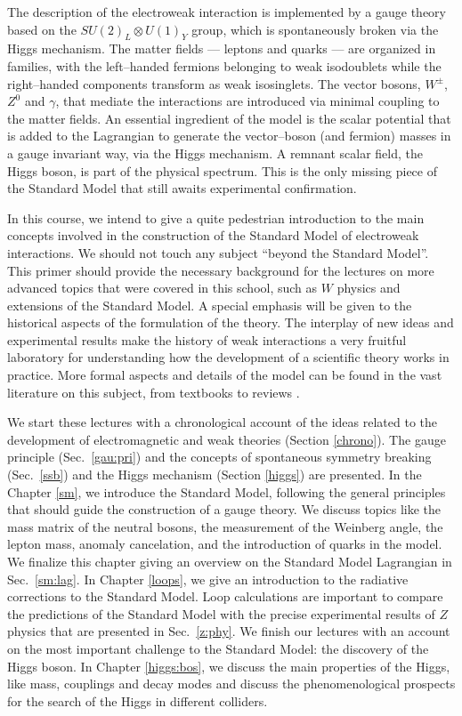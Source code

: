 \documentclass[12pt]{report}
\begin{document}
The description of the electroweak interaction is implemented by a
gauge theory based on the $SU(2)_L \otimes U(1)_Y$ group, which is
spontaneously broken via the Higgs mechanism. The matter fields ---
leptons and quarks --- are organized in families, with the
left--handed fermions belonging to weak isodoublets while the
right--handed components transform as weak isosinglets. The vector
bosons, $W^\pm$, $Z^0$ and $\gamma$, that mediate the interactions
are introduced via minimal coupling to the matter fields. An
essential ingredient of the model is the scalar potential that is
added to the Lagrangian to generate the vector--boson (and fermion)
masses in a gauge invariant way, via the Higgs mechanism. A remnant
scalar field, the Higgs boson, is part of the physical spectrum. This
is the only missing piece of the Standard Model that still awaits
experimental confirmation.  

In this course, we intend to give a quite pedestrian introduction to
the main concepts involved in the construction of the Standard Model
of electroweak interactions. We should not touch any subject ``beyond
the Standard Model''. This primer should provide the necessary
background for the lectures on more advanced topics that were 
covered in this school, such as $W$ physics and extensions of the
Standard Model. A special emphasis will be given to the historical
aspects of the formulation of the theory. The interplay of new ideas 
and experimental results make the history of weak interactions a very
fruitful laboratory for understanding how the development of a
scientific theory works in practice. More formal aspects and details
of the model can be found in the vast literature on this subject,
from textbooks
\cite{Quigg:83,Cheng:84,Halzen:84,Aitchison:90,Renton:90,Donoghue:92,Leader:96}
to reviews \cite{Abers:73,Kim:81,Beg:82,Chanowitz:88}.  

We start these lectures  with a chronological account of the ideas
related to the development of electromagnetic and weak theories
(Section \ref{chrono}). The gauge principle (Sec.\ \ref{gau:pri})
and the concepts of spontaneous symmetry breaking (Sec.\ \ref{ssb})
and the Higgs mechanism (Section \ref{higgs}) are presented. In the
Chapter \ref{sm}, we introduce the Standard Model, following the
general principles that should guide the construction of a gauge
theory. We discuss topics like the mass matrix of the neutral bosons,
the measurement of the Weinberg angle, the lepton mass, anomaly
cancelation, and the introduction of quarks in the model. We finalize
this chapter giving an overview on the Standard Model Lagrangian in
Sec.\ \ref{sm:lag}. In Chapter \ref{loops}, we give an introduction
to the radiative corrections to the Standard Model. Loop
calculations are important to compare the predictions of the
Standard Model with the precise experimental results of $Z$ physics
that are presented in Sec.\ \ref{z:phy}. We finish our lectures with
an account on the most important challenge to the Standard Model: the
discovery of the Higgs boson. In Chapter \ref{higgs:bos}, we discuss
the main properties of the Higgs, like mass, couplings and decay
modes and discuss the phenomenological prospects for the search of the
Higgs in different colliders.
\end{document}
